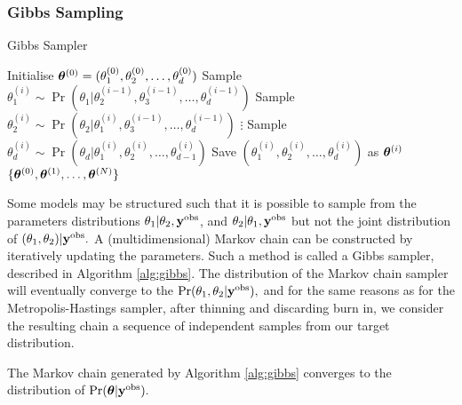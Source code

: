 \subsubsection*{Gibbs Sampling}

\begin{algorithm}[htbp]
    \caption{Gibbs Sampler}
    \label{alg:gibbs}
    \begin{algorithmic}
        \State Initialise
        $\bm{\theta}^{(0)} = (\theta_1^{(0)}, \theta_2^{(0)}, \dots, \theta_d^{(0)})$
        \State Sample
        $\theta_1^{(i)}
            \sim \Pr(
            \theta_1
            | \theta_2^{(i-1)}, \theta_3^{(i-1)}, \dots, \theta_d^{(i-1)}
            )$
        \State Sample
        $\theta_2^{(i)}
            \sim \Pr(
            \theta_2
            | \theta_1^{(i)}, \theta_3^{(i-1)}, \dots, \theta_d^{(i-1)})$
        \State $\vdots$
        \State Sample
        $\theta_d^{(i)}
            \sim \Pr(
            \theta_d
            | \theta_1^{(i)}, \theta_2^{(i)}, \dots, \theta_{d-1}^{(i)})$
        \State Save $(\theta_1^{(i)}, \theta_2^{(i)}, \dots, \theta_d^{(i)})$
        as $\bm{\theta}^{(i)}$
        \EndFor
        \State \Return $\{\bm{\theta}^{(0)}, \bm{\theta}^{(1)}, \dots, \bm{\theta}^{(N)}\}$
    \end{algorithmic}
\end{algorithm}

Some models may be structured such that it is possible
to sample from the parameters distributions 
$\theta_1 | \theta_2, \mathbf{y}^{\mathrm{obs}}$, and
$\theta_2 | \theta_1, \mathbf{y}^{\mathrm{obs}}$ but not the joint distribution of
$(\theta_1, \theta_2)| \mathbf{y}^{\mathrm{obs}}.$ A (multidimensional) Markov chain can be
constructed by iteratively updating the parameters. Such a method is called
a Gibbs sampler, described in
Algorithm \ref{alg:gibbs}. The distribution of the Markov chain
sampler will eventually converge to the
$\Pr(\theta_1, \theta_2 | \mathbf{y}^{\mathrm{obs}}),$ and for the same reasons as for
the Metropolis-Hastings
sampler, after thinning and discarding burn in, we consider the resulting
chain a sequence of independent samples from our target distribution.

\begin{theorem}
    The Markov chain generated by Algorithm \ref{alg:gibbs}
    converges to the distribution of $\Pr(\bm{\theta}|\mathbf{y}^{\mathrm{obs}}).$
\end{theorem}

